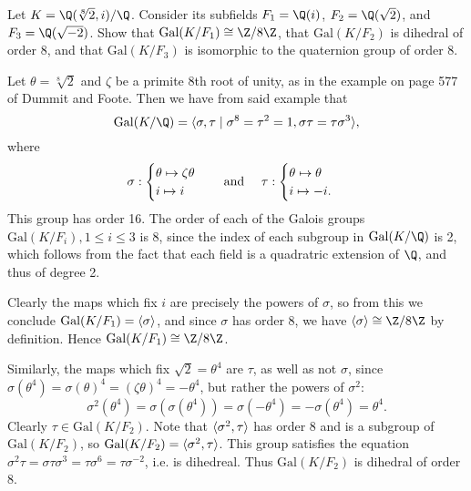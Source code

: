 \documentclass[a4paper, 11pt]{homework}
\newcommand{\Gal}{\mathrm{Gal}}
\newcommand{\gen}[1]{{\providecommand{\given}{}\renewcommand{\given}{\;\vert\;}\langle#1\rangle}}
\begin{document}
\begin{questions}
	\question{} Let \(K = \Q(\sqrt[8]{2},i)/\Q\). Consider its subfields \(F_1 = \Q(i)\), \(F_2 = \Q(\sqrt2)\), and
	\(F_3 = \Q(\sqrt{-2})\). Show that \(\Gal(K/F_1) \cong \Z/8\Z\), that \(\Gal(K/F_2)\) is dihedral of order 8, and
	that \(\Gal(K/F_3)\) is isomorphic to the quaternion group of order \(8\).
	\begin{solution}

		Let \(\theta = \sqrt[8]{2}\) and \(\zeta\) be a primite 8th root of unity, as in the example on page 577 of
		Dummit and Foote. Then we have from said example that
		\[\Gal(K/\Q) = \gen{\sigma,\tau \given \sigma^8 = \tau^2 = 1, \sigma\tau = \tau\sigma^3},\]
		where
		\[
			\sigma : \begin{cases}
				\theta \mapsto \zeta\theta \\
				i \mapsto i
			\end{cases}
			\text{\quad and \quad}
			\tau : \begin{cases}
				\theta \mapsto \theta \\
				i \mapsto -i.
			\end{cases}
		\]
		This group has order 16. The order of each of the Galois groups \(\Gal(K/F_i), 1 \le i \le 3\) is 8,
		since the index of each subgroup in \(\Gal(K/\Q)\) is 2, which follows from the fact that each field is a
		quadratric extension of \(\Q\), and thus of degree 2.

		Clearly the maps which fix \(i\) are precisely the powers of \(\sigma\), so from this we conclude \(\Gal(K/
		F_1) = \gen{\sigma}\), and since \(\sigma\) has order 8, we have \(\gen{\sigma} \cong \Z/8\Z\) by definition.
		Hence \(\Gal(K/F_1) \cong \Z/8\Z\).

		Similarly, the maps which fix \(\sqrt 2 = \theta^4\) are \(\tau\), as well as not \(\sigma\), since
		\(\sigma(\theta^4) = \sigma(\theta)^4 = (\zeta\theta)^4 = -\theta^4\), but rather the powers of \(\sigma^2\):
		\[
			\sigma^2(\theta^4) = \sigma(\sigma(\theta^4)) = \sigma(-\theta^4) = -\sigma(\theta^4) = \theta^4.
		\]
		Clearly \(\tau \in \Gal(K/F_2)\). Note that \(\gen{\sigma^2,\tau}\) has order \(8\) and is a subgroup of
		\(\Gal(K/F_2)\), so \(\Gal(K/F_2) = \gen{\sigma^2,\tau}\). This group satisfies the equation \(\sigma^2\tau =
		\sigma\tau\sigma^3 = \tau\sigma^6 = \tau\sigma^{-2}\), i.e. is dihedreal. Thus \(\Gal(K/F_2)\) is dihedral of
		order 8.


\end{solution}
\end{questions}
\end{document}
